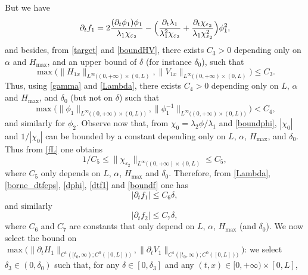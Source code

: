 \documentclass[JEP,XML,SOM,Unicode]{cedram}
\theoremstyle{definition}
\begin{document}
But we have
\begin{equation}
\label{dtf1}
\partial_{t}f_{1}=2\frac{(\partial_{t}\phi_{1})\phi_{1}}{\lambda_{1}\chi_{\varepsilon_{2}}}-\Bigl(\frac{\partial_{t}\lambda_{1}}{\lambda_{1}^{2}\chi_{\varepsilon_{2}}}+\frac{\partial_{t}\chi_{\varepsilon_{2}}}{\lambda_{1}\chi^{2}_{\varepsilon_{2}}} \Bigr)\phi_{1}^2,
\end{equation}
and besides, from \eqref{target} and \eqref{boundHV}, there exists $C_{3}>0$ depending only on $\alpha$ and $H_{\max}$, and an upper bound of $\delta$ (for instance ${\delta_{0}}$), such that
\begin{equation*}
\max\bigl(\lVert H_{1x}\rVert_{L^{\infty}((0,+\infty)\times(0,L)},\lVert V_{1x}\rVert_{L^{\infty}((0,+\infty)\times(0,L)}\bigr)\leq C_{3}.
\end{equation*}
Thus, using \eqref{gamma} and \eqref{Lambda}, there exists $C_{4}>0$ depending only on {$L$,} $\alpha$ and $H_{\max}$, and $\delta_{0}$ (but not on $\delta$) such that
\begin{equation}
\max \bigl(\lVert\phi_{1}\rVert_{L^{\infty}((0,+\infty)\times(0,L){)}},\lVert\phi^{-1}_{{1}}\rVert_{L^{\infty}((0,+\infty)\times(0,L){)}} \bigr)<C_{4},
\label{boundphi}
\end{equation}
and similarly for $\phi_{2}$.
Observe now that, from $\chi_{0}=\lambda_{2}\phi/\lambda_{1}$ and \eqref{boundphi}, $|\chi_{0}|$ and $1/|\chi_{0}|$ can be bounded by a constant depending only on {$L$,} $\alpha$, $H_{\max}$, and
$\delta_{0}$. Thus from
\eqref{fL} one obtains
\begin{equation}
1/C_{5}\leq \lVert \chi_{\varepsilon_{2}}\rVert_{L^{\infty}((0,+\infty)\times(0,L)}\leq C_{5},
\label{boundf}
\end{equation}
where $C_{5}$ only depends on {$L$,} $\alpha$, $H_{\max}$ and $\delta_{0}$.
{Therefore}, from
\eqref{Lambda}, \eqref{borne_dtfeps}, \eqref{dphi}, {\eqref{dtf1}} and \eqref{boundf} one has
\begin{equation*}
|\partial_{t}f_{1}|\leq C_{6}\delta,
\end{equation*}
and similarly
\begin{equation*}
|\partial_{t}f_{2}|\leq C_{7}\delta,
\end{equation*}
where $C_{6}$ and $C_{7}$ are constants that only depend on {$L$,} $\alpha$, $H_{\max}$ (and $\delta_{0}$).
We now select the bound on
$\max \bigl({\lVert\partial_{t}H_{1}\rVert_{C^{1}([t_{0},\infty);{C^{0}([0,L])})},\lVert\partial_{t}V_{1}\rVert_{C^{1}([t_{0},\infty);{C^{0}([0,L])})}} \bigr)$:
we select $\delta_{3}\in(0,\delta_{0})$ such that, for any $\delta\in[0,\delta_{3}]$ and any $(t,x)\in[0,{+}\infty)\times[0,L]$,
\end{document}
